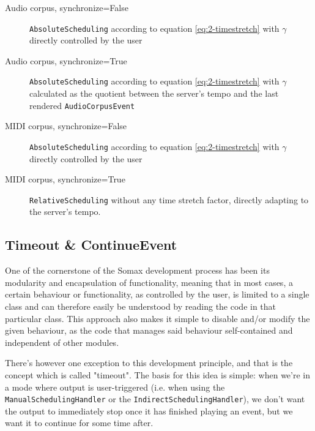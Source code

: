 \begin{description}
	\item[Audio corpus, synchronize=False] \texttt{AbsoluteScheduling} according to equation \ref{eq:2-timestretch} with $\gamma$ directly controlled by the user
	\item[Audio corpus, synchronize=True] \texttt{AbsoluteScheduling} according to equation \ref{eq:2-timestretch} with $\gamma$ calculated as the quotient between the server's tempo and the last rendered \texttt{AudioCorpusEvent}
	\item[MIDI corpus, synchronize=False] \texttt{AbsoluteScheduling} according to equation \ref{eq:2-timestretch} with $\gamma$ directly controlled by the user
	\item[MIDI corpus, synchronize=True] \texttt{RelativeScheduling} without any time stretch factor, directly adapting to the server's tempo.
\end{description}



\subsection{Timeout \& ContinueEvent}\label{ssec:2-timeout}

One of the cornerstone of the Somax development process has been its modularity and encapsulation of functionality, meaning that in most cases, a certain behaviour or functionality, as controlled by the user, is limited to a single class and can therefore easily be understood by reading the code in that particular class. This approach also makes it simple to disable and/or modify the given behaviour, as the code that manages said behaviour self-contained and independent of other modules. 

There's however one exception to this development principle, and that is the concept which is called "timeout". The basis for this idea is simple: when we're in a mode where output is user-triggered (i.e. when using the \texttt{ManualSchedulingHandler} or the \texttt{IndirectSchedulingHandler}), we don't want the output to immediately stop once it has finished playing an event, but we want it to continue for some time after. 

